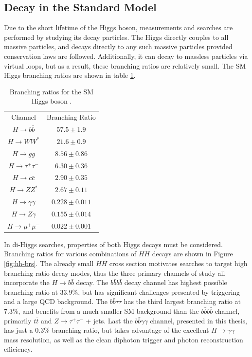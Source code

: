 \subsection{Decay in the Standard Model}

Due to the short lifetime of the Higgs boson, measurements and searches are performed by studying its decay particles. The Higgs directly couples to all massive particles, and decays directly to any such massive particles provided conservation laws are followed. Additionally, it can decay to massless particles via virtual loops, but as a result, these branching ratios are relatively small. The \gls{SM} Higgs branching ratios are shown in table \ref{tab:higgs-decays}. 

\begin{table}[!thp]
    \centering
    \caption[Branching ratios for the \gls{SM} Higgs boson]{Branching ratios for the \gls{SM} Higgs boson \cite{pdg}.}
    \begin{tabular}{c|c}
        Channel & Branching Ratio \\
        \cline{1-2}
        $H \rightarrow b\bar{b}$ & $57.5 \pm 1.9$\\
        $H \rightarrow WW^*$ & $21.6 \pm 0.9$\\
        $H \rightarrow gg$ & $8.56 \pm 0.86$\\
        $H \rightarrow \tau^+ \tau^-$ & $6.30 \pm 0.36$\\
        $H \rightarrow c\bar{c}$ & $2.90 \pm 0.35$\\
        $H \rightarrow ZZ^*$ & $2.67 \pm 0.11$\\
        $H \rightarrow \gamma\gamma$ & $0.228 \pm 0.011$\\
        $H \rightarrow Z\gamma$ & $0.155 \pm 0.014$\\
        $H \rightarrow \mu^+ \mu^-$ & $0.022 \pm 0.001$
    \end{tabular}
    \label{tab:higgs-decays}
\end{table}

In di-Higgs searches, properties of both Higgs decays must be considered. Branching ratios for various combinations of $HH$ decays are shown in Figure \ref{fig:hh-brs}. The already small $HH$ cross section motivates searches to target high branching ratio decay modes, thus the three primary channels of study all incorporate the $H\rightarrow b\bar{b}$ decay. The $b\bar{b}b\bar{b}$ decay channel has highest possible branching ratio at $33.9\%$, but has significant challenges presented by triggering and a large QCD background. The $b\bar{b}\tau \tau$ has the third largest branching ratio at $7.3\%$, and benefits from a much smaller \gls{SM} background than the $b\bar{b}b\bar{b}$ channel, primarily $t\bar{t}$ and $Z\rightarrow \tau^+ \tau^-$ + jets. Last the $b\bar{b} \gamma \gamma$ channel, presented in this thesis, has just a $0.3\%$ branching ratio, but takes advantage of the excellent $H\rightarrow \gamma\gamma$ mass resolution, as well as the clean diphoton trigger and photon reconstruction efficiency.

